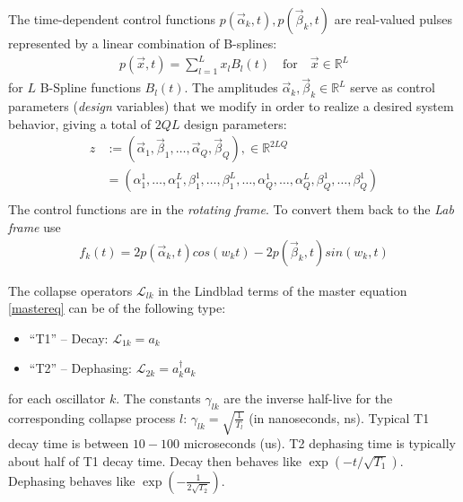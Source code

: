 \documentclass[letterpaper]{article}
\newcommand{\Ell}{\mathcal{L}}
\newcommand{\R}{\mathds{R}}
\begin{document}
The time-dependent control functions $p(\vec{\alpha}_k,t), p(\vec{\beta}_k,t)$ are real-valued pulses represented by a linear combination of B-splines: 
\begin{align*}
  p(\vec{x},t) = \sum_{l=1}^L x_l B_l(t) \quad \text{for} \quad \vec x \in \R^L
\end{align*}
for $L$ B-Spline functions $B_l(t)$. The amplitudes $\vec{\alpha}_k, \vec{\beta}_k \in \R^{L}$ serve as control parameters (\textit{design} variables) that we modify in order to realize a desired system behavior, giving a total of $2QL$ design parameters:
\begin{align*}
  z &:= \left( \vec{\alpha}_1, \vec{\beta}_1, \dots, \vec{\alpha}_Q, \vec{\beta}_Q \right), \in \mathds{R}^{2LQ} \\
    &=\left(\alpha_1^1,\dots,\alpha_1^L,\beta_1^1, \dots, \beta_1^L, \dots, \alpha_Q^1,\dots,\alpha_Q^L,\beta_Q^1, \dots, \beta_Q^1 \right) \\
\end{align*}
The control functions are in the \textit{rotating frame}. To convert them back to the \textit{Lab frame} use
\begin{align}
  f_k(t) = 2p(\vec{\alpha}_k, t) cos(w_k t) - 2 p(\vec{\beta}_k,t) sin(w_k,t)
\end{align}

The collapse operators $\Ell_{lk}$ in the Lindblad terms of the master equation \eqref{mastereq} can be of the following type:
\begin{itemize}
  \item ``T1'' -- Decay: $\Ell_{1k} = a_k$
  \item ``T2'' -- Dephasing: $\Ell_{2k} = a_k^{\dagger}a_k$
\end{itemize}
for each oscillator $k$. The constants $\gamma_{lk}$ are the inverse half-live for the corresponding collapse process $l$: $\gamma_{lk} = \sqrt{\frac{1}{T_l}}$ (in nanoseconds, ns). Typical T1 decay time is between $10-100$ microseconds (us). T2 dephasing time is typically about half of T1 decay time. Decay then behaves like $\exp(-t/\sqrt{T_1})$. Dephasing behaves like $\exp(-\frac{1}{2\sqrt{T_2}})$.
\end{document}
